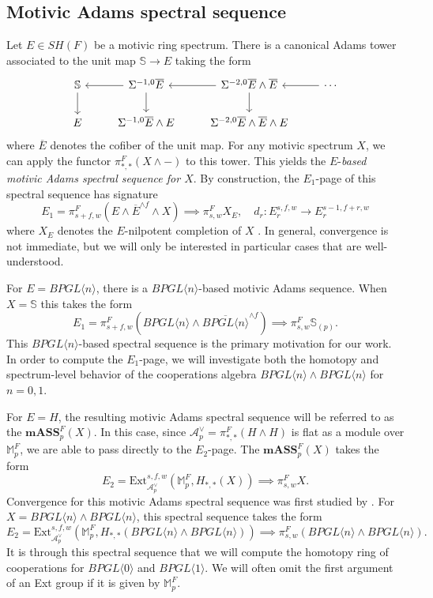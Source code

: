 \documentclass{amsart}
\theoremstyle{plain}
\numberwithin{theorem}{section}
\numberwithin{equation}{section}
\numberwithin{figure}{section}
\newcommand{\0}{\langle 0 \rangle }
\begin{document}
\subsection{Motivic Adams spectral sequence} 
\label{subsec:adams spectral sequence}
Let $E \in SH(F)$ be a motivic ring spectrum. There is a canonical Adams tower associated to the unit map $\mathbb{S} \to E$ taking the form
\[\begin{tikzcd}
	{\mathbb{S}} & {\Sigma^{-1, 0}\overline{E}} & {\Sigma^{-2, 0}\overline{E} \wedge \overline{E}} & \cdots \\
	{E} & {\Sigma^{-1, 0}\overline{E} \wedge E} & {\Sigma^{-2, 0}\overline{E} \wedge \overline{E} \wedge E}
	\arrow[from=1-1, to=2-1]
	\arrow[from=1-2, to=1-1]
	\arrow[from=1-2, to=2-2]
	\arrow[from=1-3, to=1-2]
	\arrow[from=1-3, to=2-3]
	\arrow[from=1-4, to=1-3]
\end{tikzcd}\]
where $\overline{E}$ denotes the cofiber of the unit map. For any motivic spectrum $X$, we can apply the functor $\pi_{*,*}^F(X \wedge-)$ to this tower. This yields the $E$-\textit{based motivic Adams spectral sequence for $X$}. By construction, the $E_1$-page of this spectral sequence has signature
\[E_1 = \pi^F_{s+f, w}(E \wedge \overline{E}^{\wedge f} \wedge X) \implies \pi_{s, w}^FX_E, \quad d_r:E_r^{s,f,w} \to E_r^{s-1, f+r, w}\]
where $X_E$ denotes the $E$-nilpotent completion of $X$ \cite{Bousfield79}. In general, convergence is not immediate, but we will only be interested in particular cases that are well-understood. 

For $E=BPGL \langle n \rangle$, there is a $BPGL \langle n \rangle$-based motivic Adams sequence. When $X=\mathbb{S}$ this takes the form
\[E_1=\pi^F_{s+f, w}(BPGL \langle n \rangle \wedge \overline{BPGL \langle n \rangle}^{\wedge f}) \implies \pi^F_{s,w}\mathbb{S}_{(p)}.\]
This $BPGL \langle n \rangle$-based spectral sequence is the primary motivation for our work. In order to compute the $E_1$-page, we will investigate both the homotopy and spectrum-level behavior of the cooperations algebra $BPGL \langle n \rangle \wedge BPGL \langle n \rangle$ for $n=0, 1$.

For $E=H$, the resulting motivic Adams spectral sequence will be referred to as the $\textbf{mASS}_p^{F}(X)$. In this case, since $\mathcal{A}_p^\vee = \pi_{*,*}^{F}(H\wedge H)$ is flat as a module over $\mathbb{M}_p^{F}$, we are able to pass directly to the $E_2$-page. The $\textbf{mASS}_p^{F}(X)$ takes the form
\[E_2 = \text{Ext}^{s,f,w}_{\mathcal{A}_p^\vee}(\mathbb{M}_p^F,H_{*,*}(X)) \implies \pi_{s,w}^{F}X.\]
Convergence for this motivic Adams spectral sequence was first studied by \cite{HKO-convergencemASS,DImASS}. For $X=BPGL \langle n \rangle \wedge BPGL \langle n \rangle$, this spectral sequence takes the form
\[E_2 = \text{Ext}^{s,f,w}_{\mathcal{A}^\vee_p}(\mathbb{M}_p^F,H_{*,*}(BPGL \langle n \rangle \wedge BPGL \langle n \rangle )) \implies \pi_{s,w}^F(BPGL \langle n \rangle \wedge BPGL \langle n \rangle).\] 
It is through this spectral sequence that we will compute the homotopy ring of cooperations for $BPGL \langle0 \rangle$ and $BPGL \langle 1 \rangle$. We will often omit the first argument of an Ext group if it is given by $\mathbb{M}_p^F$.
\end{document}

